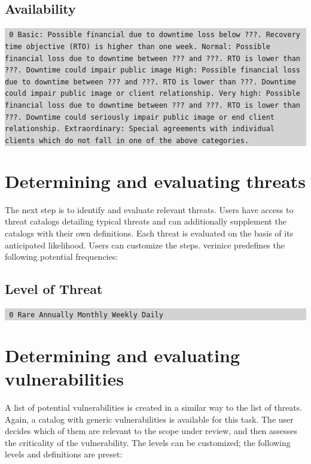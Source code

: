\documentclass[a4paper,10pt]{book}
\begin{document}
\subsection{Availability}
\colorbox{lightgray}{\parbox{\textwidth}{
{\tt
0 Basic: Possible financial due to downtime loss below ???. Recovery time
objective (RTO) is higher than one week.
\newline{} Normal: Possible financial loss due to downtime between ??? and ???. RTO is
lower than ???. Downtime could impair public image
\newline{} High: Possible financial loss due to downtime between ??? and ???. RTO is
lower than ???. Downtime could impair public image or client relationship.
\newline{} Very high: Possible financial loss due to downtime between ??? and ???. RTO
is lower than ???. Downtime could seriously impair public image or end client
relationship.
\newline{} Extraordinary: Special agreements with individual clients which do not fall
in one of the above categories.}
}}

\section{Determining and evaluating threats}
The next step is to identify and evaluate relevant threats. Users have access to threat catalogs
detailing typical threats and can additionally supplement the catalogs with their own definitions.
Each threat is evaluated on the basis of its anticipated likelihood. Users can customize the steps.
verinice predefines the following potential frequencies:

\subsection{Level of Threat}
\colorbox{lightgray}{\parbox{\textwidth}{
{\tt
0 Rare  Annually  Monthly  Weekly  Daily}
}}

\section{Determining and evaluating vulnerabilities}
A list of potential vulnerabilities is created in a similar way to the list of threats. Again, a catalog
with generic vulnerabilities is available for this task. The user decides which of them are relevant to the
scope under review, and then assesses the criticality of the vulnerability. The levels can be customized;
the following levels and definitions are preset:
\end{document}
